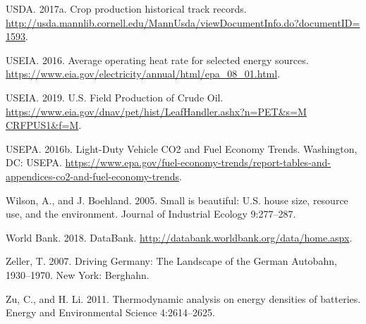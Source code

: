 USDA. 2017a. Crop production historical track records. \url{http://usda.mannlib.cornell.edu/MannUsda/viewDocumentInfo.do?documentID​=​1593}.\par
USEIA. 2016. Average operating heat rate for selected energy sources. \url{https://www.eia.gov/electricity/annual/html/epa_08_01.html}.\par
USEIA. 2019. U.S. Field Production of Crude Oil. \url{https://www.eia.gov/dnav/pet/hist/LeafHandler.ashx?n​=P​ET&s​=M​ CRFPUS1&f​=​M}.\par
USEPA. 2016b. Light-Duty Vehicle CO2 and Fuel Economy Trends. Washington, DC: USEPA. \url{https://www.epa.gov/fuel-economy-trends/report-tables-and-appendices-co2-and-fuel-economy-trends}.\par
Wilson, A., and J. Boehland. 2005. Small is beautiful: U.S. house size, resource use, and the environment. Journal of Industrial Ecology 9:277–287.\par
World Bank. 2018. DataBank. \url{http://databank.worldbank.org/data/home.aspx}.\par
Zeller, T. 2007. Driving Germany: The Landscape of the German Autobahn, 1930–1970. New York: Berghahn.\par
Zu, C., and H. Li. 2011. Thermodynamic analysis on energy densities of batteries. Energy and Environmental Science 4:2614–2625.\par
